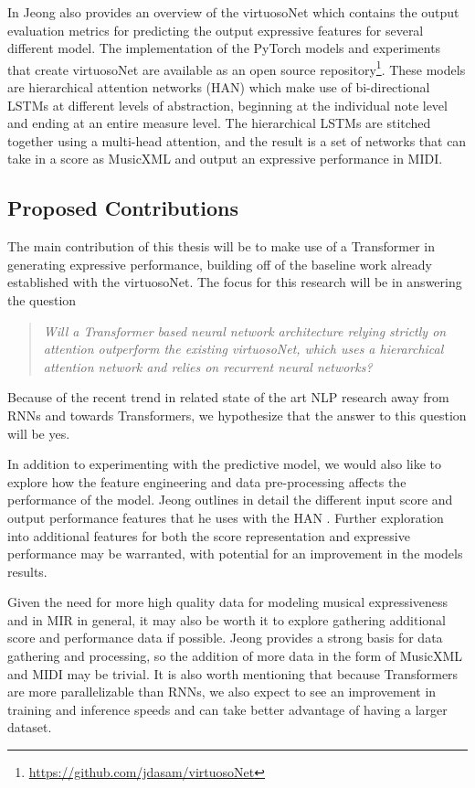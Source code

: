 \documentclass[letterpaper,12pt]{article}
\begin{document}
In \cite{jeong2019virtuosonet} Jeong also provides an overview of the virtuosoNet which contains the output evaluation metrics for predicting the output expressive features for several different model. The implementation of the PyTorch models and experiments that create virtuosoNet are available as an open source repository\footnote{\url{https://github.com/jdasam/virtuosoNet}}. These models are hierarchical attention networks (HAN) which make use of bi-directional LSTMs at different levels of abstraction, beginning at the individual note level and ending at an entire measure level. The hierarchical LSTMs are stitched together using a multi-head attention, and the result is a set of networks that can take in a score as MusicXML and output an expressive performance in MIDI. 

\subsection{Proposed Contributions}
The main contribution of this thesis will be to make use of a Transformer in generating expressive performance, building off of the baseline work already established with the virtuosoNet. The focus for this research will be in answering the question 
	\begin{quote} \textit{Will a Transformer based neural network architecture relying strictly on attention outperform the existing virtuosoNet, which uses a hierarchical attention network and relies on recurrent neural networks?}
	\end{quote}
Because of the recent trend in related state of the art NLP research away from RNNs and towards Transformers, we hypothesize that the answer to this question will be yes. 

In addition to experimenting with the predictive model, we would also like to explore how the feature engineering and data pre-processing affects the performance of the model. Jeong outlines in detail the different input score and output performance features that he uses with the HAN \cite{jeong2018virtuosonet}. Further exploration into additional features for both the score representation and expressive performance may be warranted, with potential for an improvement in the models results. 

Given the need for more high quality data for modeling musical expressiveness and in MIR in general, it may also be worth it to explore gathering additional score and performance data if possible. Jeong provides a strong basis for data gathering and processing, so the addition of more data in the form of MusicXML and MIDI may be trivial. It is also worth mentioning that because Transformers are more parallelizable than RNNs, we also expect to see an improvement in training and inference speeds and can take better advantage of having a larger dataset. 
\end{document}

